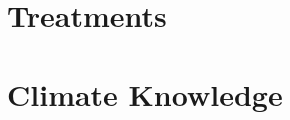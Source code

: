 \documentclass[aspectratio=169,9pt,dvipsnames]{beamer}
\begin{document}
\section{Treatments}

%


\section{Climate Knowledge}

\end{document}
